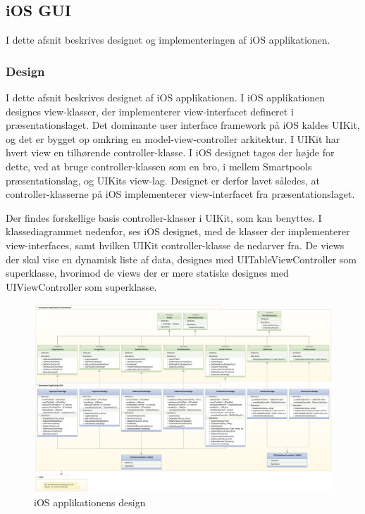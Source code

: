 \subsection{iOS GUI}
I dette afsnit beskrives designet og implementeringen af iOS applikationen.

\subsubsection{Design}
I dette afsnit beskrives designet af iOS applikationen. I iOS applikationen designes view-klasser, der implementerer view-interfacet defineret i præsentationslaget. Det dominante user interface framework på iOS kaldes UIKit, og det er bygget op omkring en model-view-controller arkitektur. I UIKit har hvert view en tilhørende controller-klasse. I iOS designet tages der højde for dette, ved at bruge controller-klassen som en bro, i mellem Smartpools præsentationslag, og UIKits view-lag. Designet er derfor lavet således, at controller-klasserne på iOS implementerer view-interfacet fra præsentationslaget.

Der findes forskellige basis controller-klasser i UIKit, som kan benyttes. I klassediagrammet nedenfor, ses iOS designet, med de klasser der implementerer view-interfaces, samt hvilken UIKit controller-klasse de nedarver fra. De views der skal vise en dynamisk liste af data, designes med UITableViewController som superklasse, hvorimod de views der er mere statiske designes med UIViewController som superklasse. 

\begin{landscape}
\begin{figure}
	\centering
	\includegraphics[width=0.9\linewidth]{figs/design/ios_full}
	\caption{iOS applikationens design}
	\label{fig:ios_full}
\end{figure}
\end{landscape}

